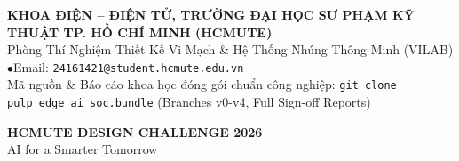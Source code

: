 \documentclass[10pt]{article}
\begin{document}
\vfill

\begin{tcolorbox}[
    enhanced,
    boxrule=0pt,
    arc=2.8mm,
    left=6mm, right=6mm, top=3.2mm, bottom=3.2mm,
    colback=headerNavy,
    colframe=socCyan
]
\begin{minipage}[c]{0.73\textwidth}
    {\fontsize{8.5}{10}\selectfont \color{white}\textbf{KHOA ĐIỆN -- ĐIỆN TỬ, TRƯỜNG ĐẠI HỌC SƯ PHẠM KỸ THUẬT TP. HỒ CHÍ MINH (HCMUTE)}}\\[1.5pt]
    {\fontsize{7.5}{8.8}\selectfont \color{socGold}Phòng Thí Nghiệm Thiết Kế Vi Mạch \& Hệ Thống Nhúng Thông Minh (VILAB) \quad$\bullet$\quad Email: \texttt{24161421@student.hcmute.edu.vn}}\\[1.5pt]
    {\fontsize{7}{8.2}\selectfont \color{socCyanLight}Mã nguồn \& Báo cáo khoa học đóng gói chuẩn công nghiệp: \texttt{git clone pulp\_edge\_ai\_soc.bundle} (Branches v0-v4, Full Sign-off Reports)}
\end{minipage}
\hfill
\begin{minipage}[c]{0.25\textwidth}
    \centering
    \begin{tcolorbox}[
        enhanced,
        boxrule=0.6pt,
        arc=1.6mm,
        left=2mm, right=2mm, top=1.5mm, bottom=1.5mm,
        colback=headerMid,
        colframe=socCyan
    ]
        \centering
        {\fontsize{8}{9}\selectfont \textbf{\color{socGold}HCMUTE DESIGN CHALLENGE 2026}}\\[1pt]
        {\fontsize{7}{8}\selectfont \color{white}AI for a Smarter Tomorrow}
    \end{tcolorbox}
\end{minipage}
\end{tcolorbox}
\end{document}
